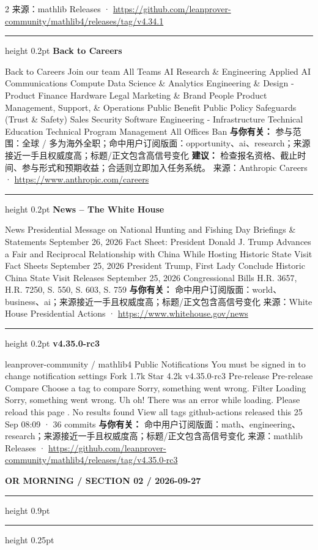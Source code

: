 \documentclass[10.5pt]{ctexart}
\begin{document}
\begin{multicols}{2}
{\footnotesize\color{ormuted} 来源：mathlib Releases · \url{https://github.com/leanprover-community/mathlib4/releases/tag/v4.34.1}}
\vspace{2mm}
\hrule height 0.2pt
\vspace{2mm}
{\large\bfseries Back to Careers}\par
Back to Careers Join our team All Teams AI Research \& Engineering Applied AI Communications Compute Data Science \& Analytics Engineering \& Design - Product Finance Hardware Legal Marketing \& Brand People Product Management, Support, \& Operations Public Benefit Public Policy Safeguards (Trust \& Safety) Sales Security Software Engineering - Infrastructure Technical Education Technical Program Management All Offices Ban
\textbf{与你有关：} 参与范围：全球 / 多为海外全职；命中用户订阅版面：opportunity、ai、research；来源接近一手且权威度高；标题/正文包含高信号变化
\textbf{建议：} 检查报名资格、截止时间、参与形式和预期收益；合适则立即加入任务系统。
{\footnotesize\color{ormuted} 来源：Anthropic Careers · \url{https://www.anthropic.com/careers}}
\vspace{2mm}
\hrule height 0.2pt
\vspace{2mm}
{\large\bfseries News – The White House}\par
News Presidential Message on National Hunting and Fishing Day Briefings \& Statements September 26, 2026 Fact Sheet: President Donald J. Trump Advances a Fair and Reciprocal Relationship with China While Hosting Historic State Visit Fact Sheets September 25, 2026 President Trump, First Lady Conclude Historic China State Visit Releases September 25, 2026 Congressional Bills H.R. 3657, H.R. 7250, S. 550, S. 603, S. 759 
\textbf{与你有关：} 命中用户订阅版面：world、business、ai；来源接近一手且权威度高；标题/正文包含高信号变化
{\footnotesize\color{ormuted} 来源：White House Presidential Actions · \url{https://www.whitehouse.gov/news}}
\vspace{2mm}
\hrule height 0.2pt
\vspace{2mm}
{\large\bfseries v4.35.0-rc3}\par
leanprover-community / mathlib4 Public Notifications You must be signed in to change notification settings Fork 1.7k Star 4.2k v4.35.0-rc3 Pre-release Pre-release Compare Choose a tag to compare Sorry, something went wrong. Filter Loading Sorry, something went wrong. Uh oh! There was an error while loading. Please reload this page . No results found View all tags github-actions released this 25 Sep 08:09 · 36 commits
\textbf{与你有关：} 命中用户订阅版面：math、engineering、research；来源接近一手且权威度高；标题/正文包含高信号变化
{\footnotesize\color{ormuted} 来源：mathlib Releases · \url{https://github.com/leanprover-community/mathlib4/releases/tag/v4.35.0-rc3}}
\end{multicols}
\newpage
{\small\bfseries OR MORNING / SECTION 02 / 2026-09-27}
\vspace{2mm}
\hrule height 0.9pt
\vspace{1.5mm}
\hrule height 0.25pt
\vspace{4mm}
\end{document}

